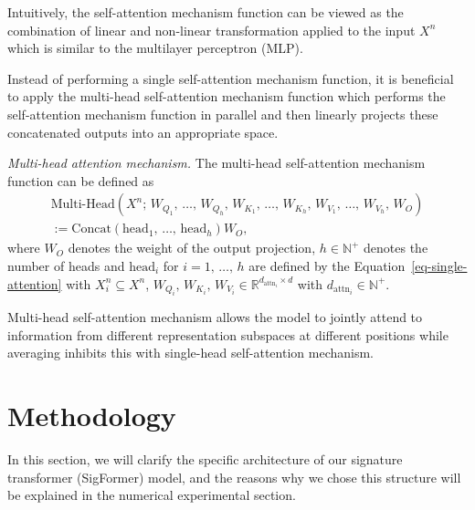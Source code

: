 \documentclass[]{article}
\renewcommand{\(}{\left(}
\renewcommand{\)}{\right)}
\begin{document}
	Intuitively, the self-attention mechanism function can be viewed as the combination of linear and non-linear transformation applied to the input $X^n$ which is similar to the multilayer perceptron (MLP).
	
	Instead of performing a single self-attention mechanism function, it is beneficial to apply the multi-head self-attention mechanism function which performs the self-attention mechanism function in parallel and then linearly projects these concatenated outputs into an appropriate space.
	
	\textit{Multi-head attention mechanism.} The multi-head self-attention mechanism function can be defined as
	\begin{eqnarray}
		\label{eq-multi-attention}
		\text{Multi-Head}(X^n;\,W_{Q_1},\,\ldots,\,W_{Q_h},\,W_{K_1},\,\ldots,\,W_{K_h},\,W_{V_1},\,\ldots,\,W_{V_h},\,W_O) \nonumber\\
		:= \text{Concat}(\text{head}_1,\,\ldots,\,\text{head}_h)W_O,
	\end{eqnarray}
	where $W_O$ denotes the weight of the output projection, $h\in\mathbb{N}^+$ denotes the number of heads and $\text{head}_i$ for $i=1,\,\ldots,\,h$ are defined by the Equation~\eqref{eq-single-attention} with $X^n_i\subseteq X^n$, $W_{Q_i},\,W_{K_i},\,W_{V_i}\in\mathbb{R}^{d_{\text{attn}_i}\times d}$ with $d_{\text{attn}_i}\in\mathbb{N}^+$.
	
	Multi-head self-attention mechanism allows the model to jointly attend to information from different representation subspaces at different positions while averaging inhibits this with single-head self-attention mechanism.
	
	\section{Methodology}\label{sec-methodology}
	In this section, we will clarify the specific architecture of our signature transformer (SigFormer) model, and the reasons why we chose this structure will be explained in the numerical experimental section.
	
\end{document}
